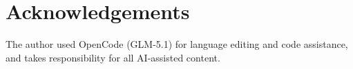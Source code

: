 \section*{Acknowledgements}

The author used OpenCode (GLM-5.1) for language editing and code assistance, and takes responsibility for all AI-assisted content.
